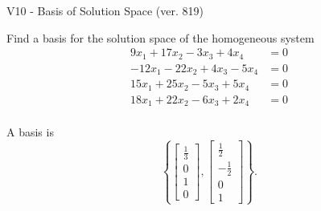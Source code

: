 \begin{exercise}
  \begin{exerciseTitle}V10 - Basis of Solution Space (ver. 819)\end{exerciseTitle}
  \begin{exerciseStatement}
    Find a basis for the solution space of the homogeneous system 
\begin{align*}
 9 x_ 1 + 17 x_ 2 -3 x_ 3 + 4 x_ 4 &= 0  \\ 
  -12 x_ 1 -22 x_ 2 + 4 x_ 3 -5 x_ 4 &= 0  \\ 
  15 x_ 1 + 25 x_ 2 -5 x_ 3 + 5 x_ 4 &= 0  \\ 
  18 x_ 1 + 22 x_ 2 -6 x_ 3 + 2 x_ 4 &= 0  \\ 
 \end{align*}


 
  \end{exerciseStatement}

  \begin{exerciseAnswer}
   A basis is   
\[\left\{\left[\begin{array}{c}
\frac{1}{3} \\
0 \\
1 \\
0
\end{array}\right] , \left[\begin{array}{c}
\frac{1}{2} \\
-\frac{1}{2} \\
0 \\
1
\end{array}\right]\right\}.\]

  


  \end{exerciseAnswer}
\end{exercise}